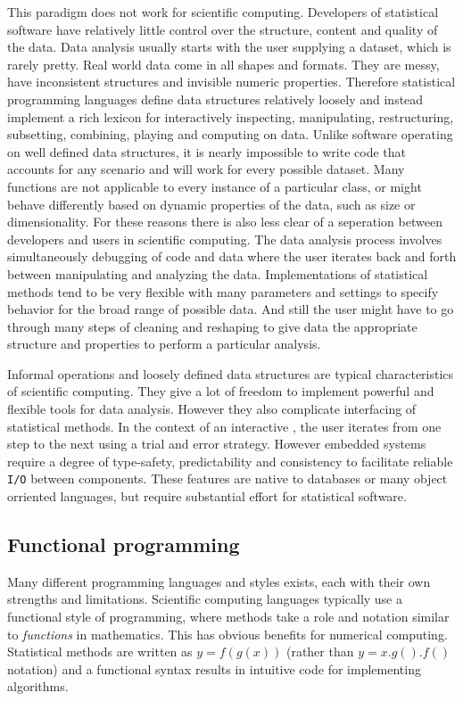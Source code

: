 This paradigm does not work for scientific computing. Developers of statistical software have relatively little control over the structure, content and quality of the data. Data analysis usually starts with the user supplying a dataset, which is rarely pretty. Real world data come in all shapes and formats. They are messy, have inconsistent structures and invisible numeric properties. Therefore statistical programming languages define data structures relatively loosely and instead implement a rich lexicon for interactively inspecting, manipulating, restructuring, subsetting, combining, playing and computing on data. Unlike software operating on well defined data structures, it is nearly impossible to write code that accounts for any scenario and will work for every possible dataset. Many functions are not applicable to every instance of a particular class, or might behave differently based on dynamic properties of the data, such as size or dimensionality. For these reasons there is also less clear of a seperation between developers and users in scientific computing. The data analysis process involves simultaneously debugging of code and data where the user iterates back and forth between manipulating and analyzing the data. Implementations of statistical methods tend to be very flexible with many parameters and settings to specify behavior for the broad range of possible data. And still the user might have to go through many steps of cleaning and reshaping to give data the appropriate structure and properties to perform a particular analysis. 

Informal operations and loosely defined data structures are typical characteristics of scientific computing. They give a lot of freedom to implement powerful and flexible tools for data analysis. However they also complicate interfacing of statistical methods. In the context of an interactive \UI, the user iterates from one step to the next using a trial and error strategy. However embedded systems require a degree of type-safety, predictability and consistency to facilitate reliable \texttt{I/O} between components. These features are native to databases or many object orriented languages, but require substantial effort for statistical software. 


\subsection{Functional programming}

Many different programming languages and styles exists, each with their own strengths and limitations. Scientific computing languages typically use a functional style of programming, where methods take a role and notation similar to \emph{functions} in mathematics. This has obvious benefits for numerical computing. Statistical methods are written as $y = f(g(x))$ (rather than $y = x.g().f()$ notation) and a functional syntax results in intuitive code for implementing algorithms. 

